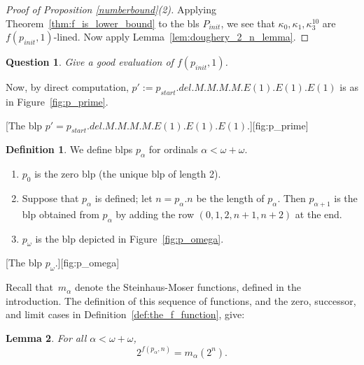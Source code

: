 \documentclass{article}
\newtheorem{lemma}{Lemma}[section]
\newtheorem{question}{Question}
\theoremstyle{definition}
\newtheorem{definition}[lemma]{Definition}
\theoremstyle{remark}
\begin{document}

\begin{proof}[Proof of Proposition \ref{numberbound}(2)]
Applying Theorem~\ref{thm:f_is_lower_bound} to the bls $P_{init}$, we see that $\kappa_0,\kappa_1,\kappa_3^{10}$ are $f(p_{init},1)$-lined. Now apply Lemma~\ref{lem:doughery_2_n_lemma}.
\end{proof}


\begin{question}
    Give a good evaluation of $f(p_{init},1)$.
\end{question}

Now, by direct computation, $p' := p_{start}.del.M.M.M.M.E(1).E(1).E(1)$ is as in Figure~\ref{fig:p_prime}.

[The blp $p' = p_{start}.del.M.M.M.M.E(1).E(1).E(1)$.][fig:p_prime]


\begin{definition} \label{def:canonical_blps_up_to_omega_plus_2} 
We define blps $p_\alpha$ for ordinals $\alpha<\omega+\omega$. 
  \begin{enumerate}
    \item $p_0$ is the zero blp (the unique blp of length 2).
    \item Suppose that $p_\alpha$ is defined; let $n = p_\alpha.n$ be the length of $p_\alpha$. Then $p_{\alpha+1}$ is the blp obtained from $p_\alpha$ by adding the row $(0,1,2,n+1,n+2)$ at the end. 
    \item $p_\omega$ is the blp depicted in Figure~\ref{fig:p_omega}.
  \end{enumerate}  
\end{definition}



[The blp $p_\omega$.][fig:p_omega]

Recall that~$m_\alpha$ denote the Steinhaus-Moser functions, defined in the introduction. The definition of this sequence of functions, and the zero, successor, and limit cases in Definition~\ref{def:the_f_function}, give:

\begin{lemma} \label{lem:p_alpha_and_Steinhaus_Moser}
  For all $\alpha<\omega+\omega$, 
   \[
   2^{f(p_{\alpha}, n)} = m_{\alpha}(2^n). 
   \]
\end{lemma}
\end{document}
